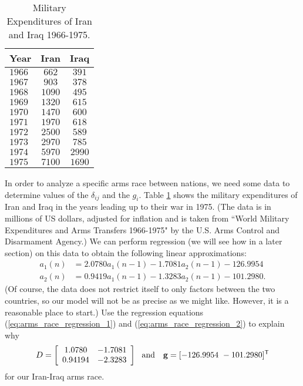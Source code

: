 \begin{table}[h]
\begin{center}
\begin{tabular}{lcc}
Year			& Iran 		& Iraq \\ \hline 
$1966$		&$662$		&$391$ \\ \hline	
$1967$		&$903$		&$378$ \\ \hline	
$1968$		&$1090$		&$495$ \\ \hline	
$1969$		&$1320$		&$615$ \\ \hline	
$1970$		&$1470$		&$600$ \\ \hline	
$1971$		&$1970$		&$618$ \\ \hline	
$1972$		&$2500$		&$589$ \\ \hline	
$1973$		&$2970$		&$785$ \\	 \hline
$1974$		&$5970$		&$2990$ \\ \hline 
$1975$		&$7100$		&$1690$
\end{tabular}
\caption{Military Expenditures of Iran and Iraq 1966-1975.}
\label{T:Expenditures}
\end{center}
\end{table}

\begin{pactivity} \label{act:arms_race_2} In order to analyze a specific arms race between nations, we need some data to determine values of the $\delta_{ij}$ and the $g_i$. Table \ref{T:Expenditures} shows the military expenditures of Iran and Iraq in the years leading up to their war in 1975. (The data is in millions of US dollars, adjusted for inflation and is taken from ``World Military Expenditures and Arms Transfers 1966-1975" by the U.S. Arms Control and Disarmament Agency.) We can perform regression (we will see how in a later section) on this data to obtain the following linear approximations:
\begin{align}
a_1(n) &= 2.0780a_1(n-1) - 1.7081a_2(n-1) - 126.9954 \label{eq:arms_race_regression_1} \\
a_2(n) &=  0.9419a_1(n-1) - 1.3283a_2(n-1) - 101.2980.  \label{eq:arms_race_regression_2}
\end{align}
(Of course, the data does not restrict itself to only factors between the two countries, so our model will not be as precise as we might like. However, it is a reasonable place to start.)  Use the regression equations (\ref{eq:arms_race_regression_1}) and (\ref{eq:arms_race_regression_2}) to explain why 
\[D = \left[ \begin{array}{cc} 1.0780&-1.7081 \\  0.94194&-2.3283 \end{array} \right] \ \text{ and } \ \ \mathbf{g} = [ -126.9954 \ -101.2980]^{\mathsf{T}}\]
for our Iran-Iraq arms race. 


\end{pactivity}


